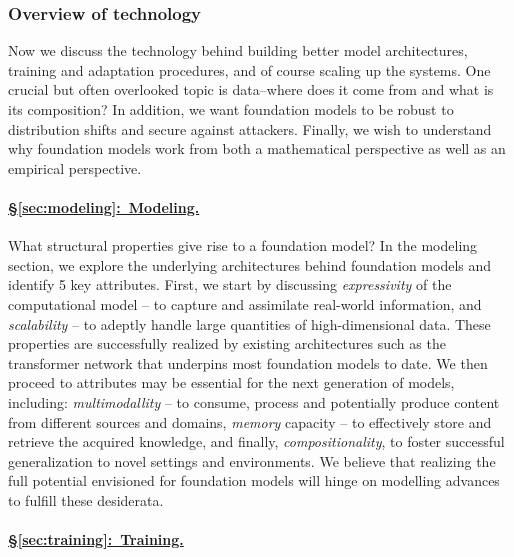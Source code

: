 \subsubsection{Overview of technology}
\label{sec:overview-technology}

Now we discuss the technology behind building better model architectures, training and adaptation procedures, and of course scaling up the systems. One crucial but often overlooked topic is data--where does it come from and what is its composition? In addition, we want foundation models to be robust to distribution shifts and secure against attackers. Finally, we wish to understand why foundation models work from both a mathematical perspective as well as an empirical perspective.

\paragraph{\hyperref[sec:modeling]{§\ref{sec:modeling}:~Modeling.}}

What structural properties give rise to a foundation model? In the modeling section, we explore the underlying architectures behind foundation models and identify 5 key attributes. First, we start by discussing \textit{expressivity} of the computational model -- to capture and assimilate real-world information, and \textit{scalability} -- to adeptly handle large quantities of high-dimensional data. These properties are successfully realized by existing architectures such as the transformer network \citep{vaswani2017attention} that underpins most foundation models to date. We then proceed to attributes may be essential for the next generation of models, including: \textit{multimodallity} -- to consume, process and potentially produce content from different sources and domains, \textit{memory} capacity -- to effectively store and retrieve the acquired knowledge, and finally, \textit{compositionality}, to foster successful generalization to novel settings and environments. We believe that realizing the full potential envisioned for foundation models will hinge on modelling advances to fulfill these desiderata.

\paragraph{\hyperref[sec:training]{§\ref{sec:training}:~Training.}}


